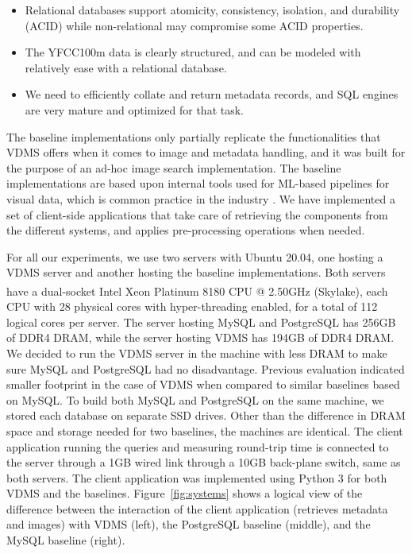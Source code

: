 \begin{itemize}
    \item Relational databases support atomicity, consistency, isolation,
    and durability (ACID) while non-relational may compromise some ACID properties.
    \item The YFCC100m data is clearly structured, and can be modeled with relatively ease with a relational database.
    \item We need to efficiently collate and return metadata records,
    and SQL engines are very mature and optimized for that task.
\end{itemize}

The baseline implementations only partially replicate the functionalities
that VDMS offers when it comes to image and metadata handling, and it was
built for the purpose of an ad-hoc image search implementation.
The baseline implementations are based upon internal tools used for ML-based
pipelines for visual data, which is common practice
in the industry \cite{haystack, tao}.
We have implemented a set of client-side applications that take care
of retrieving the components from the different systems, and applies
pre-processing operations when needed.

For all our experiments, we use two servers with Ubuntu 20.04,
one hosting a VDMS server and another hosting the baseline implementations.
Both servers have a dual-socket Intel\textsuperscript{\textregistered}
Xeon\textsuperscript{\textregistered} Platinum 8180 CPU @ 2.50GHz (Skylake),
each CPU with 28 physical cores with hyper-threading enabled,
for a total of 112 logical cores per server.
The server hosting MySQL and PostgreSQL has 256GB of DDR4 DRAM,
while the server hosting VDMS has 194GB of DDR4 DRAM.
We decided to run the VDMS server in the machine with less DRAM to make
sure MySQL and PostgreSQL had no disadvantage. Previous evaluation
indicated smaller footprint in the case of VDMS when
compared to similar baselines based on MySQL.
To build both MySQL and PostgreSQL on the same machine,
we stored each database on separate SSD drives.
Other than the difference in DRAM space and storage needed for two baselines,
the machines are identical.
The client application running the queries and measuring round-trip time
is connected to the server through a 1GB wired link through
a 10GB back-plane switch, same as both servers.
The client application was implemented using Python 3 for both VDMS and the baselines.
Figure~\ref{fig:systems} shows a logical view of the difference between the
interaction of the client application (retrieves metadata and
images) with VDMS (left), the PostgreSQL baseline (middle), and the MySQL baseline (right).

